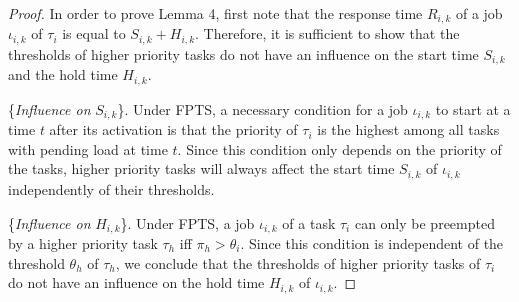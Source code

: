 \documentclass[fleqn]{article}
\begin{document}
\begin{proof}
	In order to prove Lemma 4, first note that the response time $R_{i,k}$ of a job $\iota_{i,k}$ of $\tau_i$ is equal to $S_{i,k}+H_{i,k}$. Therefore, it is sufficient to show that the thresholds of higher priority tasks do not have an influence on the start time $S_{i,k}$ and the hold time $H_{i,k}$.
	
	\{\textit{Influence on} $S_{i,k}$\}. Under FPTS, a necessary condition for a job $\iota_{i,k}$ to start at a time $t$ after its activation is that the priority of $\tau_i$ is the highest among all tasks with pending load at time $t$. Since this condition only depends on the priority of the tasks, higher priority tasks will always affect the start time $S_{i,k}$ of $\iota_{i,k}$ independently of their thresholds.
	
	\{\textit{Influence on} $H_{i,k}$\}. Under FPTS, a job $\iota_{i,k}$ of a task $\tau_i$ can only be preempted by a higher priority task $\tau_h$ iff $\pi_h > \theta_i$. Since this condition is independent of the threshold $\theta_h$ of $\tau_h$, we conclude that the thresholds of higher priority tasks of $\tau_i$ do not have an influence on the hold time $H_{i,k}$ of $\iota_{i,k}$.
\end{proof}

\begin{thebibliography}{10}
	

\end{thebibliography}
\end{document}
